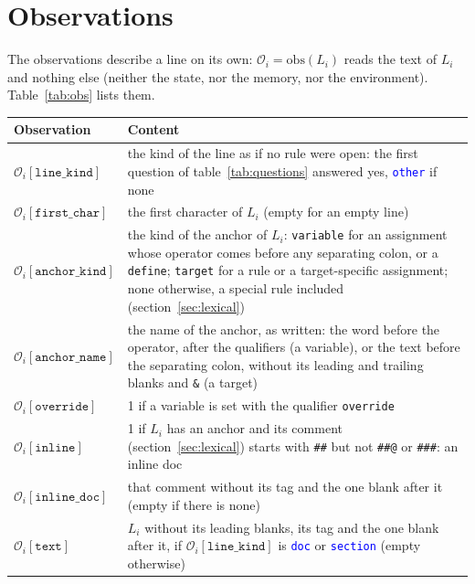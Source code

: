 \documentclass[11pt]{article}
\newcommand{\code}[1]{\mbox{\texttt{#1}}}
\newcommand{\obs}{\mathrm{obs}}
\newcommand{\kind}[1]{\textcolor{blue}{\texttt{#1}}}
\newcommand{\field}[1]{\texttt{#1}}
\newcommand{\Obs}[1]{\mathcal{O}_i[\field{#1}]}
\begin{document}
\section{Observations}
\label{sec:observations}

The observations describe a line on its own: $\mathcal{O}_i = \obs(L_i)$ reads the text of
$L_i$ and nothing else (neither the state, nor the memory, nor the environment).
Table~\ref{tab:obs} lists them.

\begin{table}[H]
\centering
\begin{tabular}{@{}lP{0.66\textwidth}@{}}
  \toprule
  Observation & Content \\
  \midrule
  $\Obs{line\_kind}$ & the kind of the line as if no rule were open: the first question of
                       table~\ref{tab:questions} answered yes, \kind{other} if none \\
  $\Obs{first\_char}$ & the first character of $L_i$ (empty for an empty line) \\
  $\Obs{anchor\_kind}$ & the kind of the anchor of $L_i$: \code{variable} for an assignment
                         whose operator comes before any separating colon, or a
                         \code{define}; \code{target} for a rule or a target-specific
                         assignment; none otherwise, a special rule included
                         (section~\ref{sec:lexical}) \\
  $\Obs{anchor\_name}$ & the name of the anchor, as written: the word before the operator,
                         after the qualifiers (a variable), or the text before the
                         separating colon, without its leading and trailing blanks and
                         \code{\&} (a target) \\
  $\Obs{override}$ & 1 if a variable is set with the qualifier \code{override} \\
  $\Obs{inline}$ & 1 if $L_i$ has an anchor and its comment (section~\ref{sec:lexical})
                   starts with \code{\#\#} but not \code{\#\#@} or \code{\#\#\#}: an inline
                   doc \\
  $\Obs{inline\_doc}$ & that comment without its tag and the one blank after it (empty if
                        there is none) \\
  $\Obs{text}$ & $L_i$ without its leading blanks, its tag and the one blank after it, if
                 $\Obs{line\_kind}$ is \kind{doc} or \kind{section} (empty otherwise) \\

\end{tabular}
\end{table}
\end{document}
